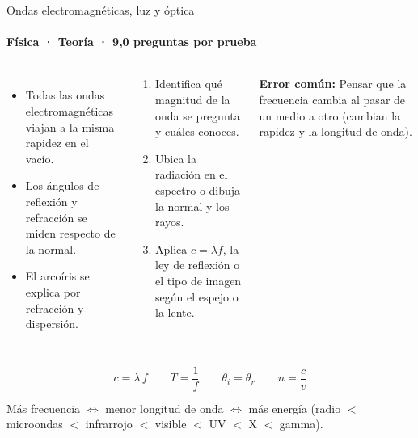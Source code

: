 \documentclass[aspectratio=169,11pt]{beamer}
\newlength{\ajustealto}
\newenvironment{ajustar}[1][0.74\textheight]
  {\setlength{\ajustealto}{#1}\begin{lrbox}{\ajustecaja}\begin{minipage}{\textwidth}}
  {\end{minipage}\end{lrbox}%
   \ifdim\dimexpr\ht\ajustecaja+\dp\ajustecaja\relax>\ajustealto
     \resizebox*{!}{\ajustealto}{\usebox{\ajustecaja}}\else\usebox{\ajustecaja}\fi}
\begin{document}
\begin{frame}{Ondas electromagnéticas, luz y óptica}
\label{tema-cs-luz}
\framesubtitle{Física · Teoría · 9,0 preguntas por prueba}
\begin{ajustar}
\begin{columns}[T,onlytextwidth]
\begin{itemize}\footnotesize
\item Todas las ondas electromagnéticas viajan a la misma rapidez en el vacío.
\item Los ángulos de reflexión y refracción se miden respecto de la normal.
\item El arcoíris se explica por refracción y dispersión.
\end{itemize}
\begin{cajaregla}\scriptsize \begin{enumerate}\item Identifica qué magnitud de la onda se pregunta y cuáles conoces.\item Ubica la radiación en el espectro o dibuja la normal y los rayos.\item Aplica $c=\lambda f$, la ley de reflexión o el tipo de imagen según el espejo o la lente.\end{enumerate}\end{cajaregla}
\begin{notagris}\scriptsize \textbf{Error común:} Pensar que la frecuencia cambia al pasar de un medio a otro (cambian la rapidez y la longitud de onda).\end{notagris}
\end{columns}
\begin{cajaclave}[Relaciones]\footnotesize
\[c=\lambda\,f \quad\quad T=\frac{1}{f} \quad\quad \theta_i=\theta_r \quad\quad n=\frac{c}{v}\]

Más frecuencia $\Leftrightarrow$ menor longitud de onda $\Leftrightarrow$ más energía (radio $<$ microondas $<$ infrarrojo $<$ visible $<$ UV $<$ X $<$ gamma).
\end{cajaclave}
\end{ajustar}
\end{frame}
\end{document}
